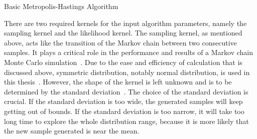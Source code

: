 \begin{algorithm}[bp!]
\BlankLine


\caption{Basic Metropolis-Hastings Algorithm}
\end{algorithm}
\clearpage
There are two required kernels for the input algorithm parameters, namely the sampling kernel and the likelihood kernel. The sampling kernel, as mentioned above, acts like the transition of the Markov chain between two consecutive samples. It plays a critical role in the performance and results of a Markov chain Monte Carlo simulation~\cite{mcmc_practice}. Due to the ease and efficiency of calculation that is discussed above, symmetric distribution, notably normal distribution, is used in this thesis~\cite{gaussian_distribution_property}. However, the shape of the kernel is left unknown and is to be determined by the standard deviation~\cite{normal}. The choice of the standard deviation is crucial. If the standard deviation is too wide, the generated samples will keep getting out of bounds. If the standard deviation is too narrow, it will take too long time to explore the whole distribution range, because it is more likely that the new sample generated is near the mean. 

